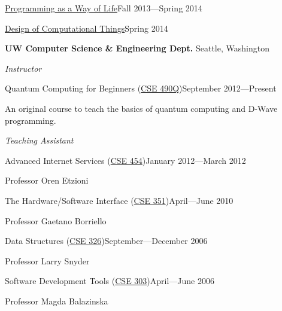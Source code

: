 \documentclass[letter]{article}
\begin{document}
\vspace{0.5\baselineskip}
\par
\href{http://ada.evergreen.edu/csf/python13f/}{Programming as a Way of Life}\hfill Fall 2013---Spring 2014
\vspace{0.5\baselineskip}
\par
\href{http://design-comp-things.org/}{Design of Computational Things}\hfill Spring 2014

\vspace{0.5\baselineskip}
\par

{\bf UW Computer Science \& Engineering Dept.} \hfill Seattle, Washington
\vspace{0.5\baselineskip}
\par
{\em Instructor}

\vspace{0.5\baselineskip}
\par
Quantum Computing for Beginners (\href{http://www.cs.washington.edu/education/courses/490q/12au/}{CSE 490Q})\hfill September 2012---Present
\par
An original course to teach the basics of quantum computing and D-Wave programming.

\vspace{0.5\baselineskip}
\par
{\em Teaching Assistant}

\vspace{0.5\baselineskip}
\par
Advanced Internet Services (\href{http://www.cs.washington.edu/education/courses/454/12wi/}{CSE 454})\hfill January 2012---March 2012
\par
Professor Oren Etzioni

\vspace{0.5\baselineskip}
\par
The Hardware/Software Interface (\href{http://www.cs.washington.edu/education/courses/351/10sp/}{CSE 351})\hfill April---June 2010
\par
Professor Gaetano Borriello

\vspace{0.5\baselineskip}
\par
Data Structures (\href{http://www.cs.washington.edu/education/courses/326/06au/}{CSE 326})\hfill September---December 2006
\par
Professor Larry Snyder

\vspace{0.5\baselineskip}
\par
Software Development Tools (\href{http://www.cs.washington.edu/education/courses/303/06sp/}{CSE 303})\hfill April---June 2006
\par
Professor Magda Balazinska
\end{document}
